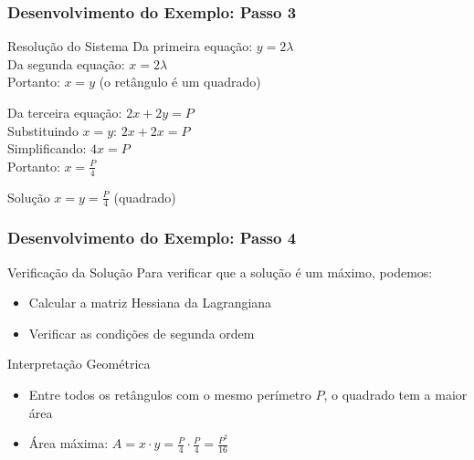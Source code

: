 \documentclass[11pt]{beamer}
\begin{document}
\begin{frame}
\frametitle{Desenvolvimento do Exemplo: Passo 3}
\large
\begin{block}{Resolução do Sistema}
Da primeira equação: $y = 2\lambda$ \\
Da segunda equação: $x = 2\lambda$ \\
\vspace{0.3cm}
Portanto: $x = y$ (o retângulo é um quadrado)
\vspace{0.3cm}

Da terceira equação: $2x + 2y = P$ \\
Substituindo $x = y$: $2x + 2x = P$ \\
Simplificando: $4x = P$ \\
Portanto: $x = \frac{P}{4}$
\end{block}

\begin{block}{Solução}
$x = y = \frac{P}{4}$ (quadrado)
\end{block}
\end{frame}

\begin{frame}
\frametitle{Desenvolvimento do Exemplo: Passo 4}
\large
\begin{block}{Verificação da Solução}
Para verificar que a solução é um máximo, podemos:
\begin{itemize}
\item Calcular a matriz Hessiana da Lagrangiana
\item Verificar as condições de segunda ordem
\end{itemize}
\end{block}

\begin{block}{Interpretação Geométrica}
\begin{itemize}
\item Entre todos os retângulos com o mesmo perímetro $P$, o quadrado tem a maior área
\item Área máxima: $A = x \cdot y = \frac{P}{4} \cdot \frac{P}{4} = \frac{P^2}{16}$
\end{itemize}
\end{block}
\end{frame}
\end{document}
